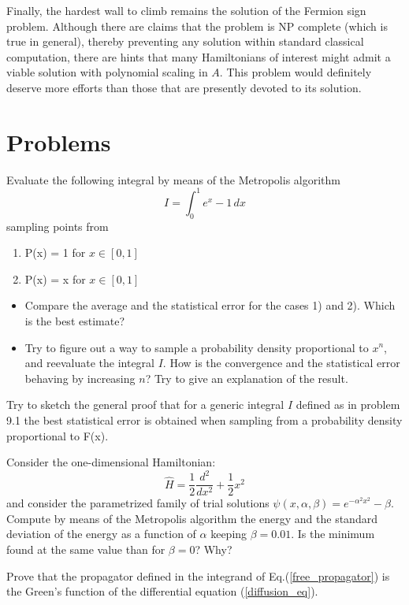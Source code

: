 Finally, the hardest wall to climb remains the solution of the Fermion sign problem. Although there are claims that the problem is NP complete (which is true in general), thereby preventing any solution within standard classical computation, there are hints that many Hamiltonians of interest might admit a viable solution with polynomial scaling in $A$. This problem would definitely deserve more efforts than those that are presently devoted to its solution.  
\section{Problems}
 \begin{prob}
  Evaluate the following integral by means of the Metropolis algorithm
  \[
  I=\int_0^1 e^{x}-1\, dx
  \]
  sampling points from
  \begin{enumerate}
  	\item P(x) = 1 for $x\in[0,1]$
  	\item P(x) = x for $x\in[0,1]$
  \end{enumerate}
  \begin{itemize}
  	\item
  Compare the average and the statistical error for the cases 1) and 2). Which is the best estimate?
  \item
  Try to figure out a way to sample a probability density proportional to $x^n$, and reevaluate the integral
  $I$. How is the convergence and the statistical error behaving by increasing $n$? Try to give an explanation of the result.  
  \end{itemize}
  \end{prob}
  \begin{prob}
  Try to sketch the general proof that for a generic integral $I$ defined as in problem 9.1 the best statistical error is obtained when sampling from a probability density proportional to F(x).
  \end{prob}
  \begin{prob}
  Consider the one-dimensional Hamiltonian:
  \[
  \hat{H}=\frac{1}{2}\frac{d^2}{dx^2}+\frac{1}{2}x^2
  \]
  and consider the parametrized family of trial solutions $\psi(x,\alpha,\beta)=e^{-\alpha^2 x^2}-\beta$. Compute by means of the  Metropolis algorithm the energy and the standard deviation of the energy as a function of $\alpha$ keeping $\beta=0.01$. Is the minimum found at the same value than for $\beta =0$? Why?
  \end{prob}
  \begin{prob}
  	Prove that the propagator defined in the integrand of Eq.(\ref{free_propagator}) is the Green's function of the differential equation (\ref{diffusion_eq}).
  \end{prob}

